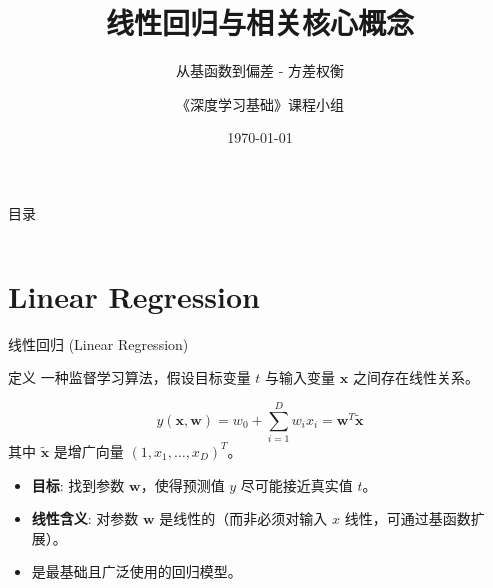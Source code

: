 \documentclass[12pt, aspectratio=169]{beamer}
\title{线性回归与相关核心概念}
\subtitle{从基函数到偏差 - 方差权衡}
\author{《深度学习基础》课程小组}
\date{\today}
\newcommand{\bw}{\mathbf{w}}
\newcommand{\bx}{\mathbf{x}}
\begin{document}
\begin{frame}
    \titlepage
\end{frame}

\begin{frame}{目录}
    \begin{columns}[t]
        \tableofcontents[sections={1-7}]
        \tableofcontents[sections={8-13}]
    \end{columns}
\end{frame}


\section{Linear Regression}
\begin{frame}{线性回归 (Linear Regression)}
    \begin{block}{定义}
        一种监督学习算法，假设目标变量 $t$ 与输入变量 $\bx$ 之间存在线性关系。
    \end{block}
    
    \begin{equation*}
        y(\bx, \bw) = w_0 + \sum_{i=1}^D w_i x_i = \bw^T \tilde{\bx}
    \end{equation*}
    其中 $\tilde{\bx}$ 是增广向量 $(1, x_1, \dots, x_D)^T$。
    
    \vspace{0.5cm}
    \begin{itemize}
        \item \textbf{目标}: 找到参数 $\bw$，使得预测值 $y$ 尽可能接近真实值 $t$。
        \item \textbf{线性含义}: 对参数 $\bw$ 是线性的（而非必须对输入 $x$ 线性，可通过基函数扩展）。
        \item 是最基础且广泛使用的回归模型。
    \end{itemize}
\end{frame}

\end{document}

